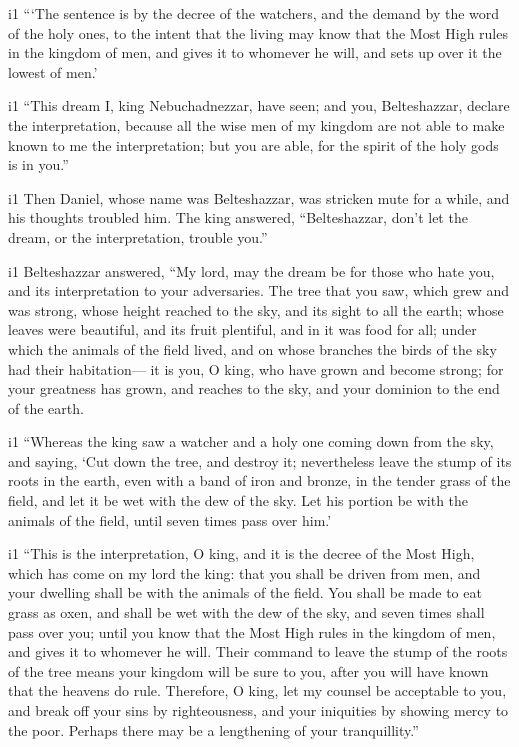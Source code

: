 i1 ```The sentence is by the decree of the watchers, and
the demand by the word of the holy ones, to the intent that the living
may know that the Most High rules in the kingdom of men, and gives it to
whomever he will, and sets up over it the lowest of men.'

i1 ``This dream I, king Nebuchadnezzar, have seen; and you,
Belteshazzar, declare the interpretation, because all the wise men of my
kingdom are not able to make known to me the interpretation; but you are
able, for the spirit of the holy gods is in you.''

i1 Then Daniel, whose name was Belteshazzar, was stricken
mute for a while, and his thoughts troubled him. The king answered,
``Belteshazzar, don't let the dream, or the interpretation, trouble
you.''

i1 Belteshazzar answered, ``My lord, may the dream be for those who hate
you, and its interpretation to your adversaries.  The tree
that you saw, which grew and was strong, whose height reached to the
sky, and its sight to all the earth;  whose leaves were
beautiful, and its fruit plentiful, and in it was food for all; under
which the animals of the field lived, and on whose branches the birds of
the sky had their habitation---  it is you, O king, who
have grown and become strong; for your greatness has grown, and reaches
to the sky, and your dominion to the end of the earth.

i1 ``Whereas the king saw a watcher and a holy one coming
down from the sky, and saying, `Cut down the tree, and destroy it;
nevertheless leave the stump of its roots in the earth, even with a band
of iron and bronze, in the tender grass of the field, and let it be wet
with the dew of the sky. Let his portion be with the animals of the
field, until seven times pass over him.'

i1 ``This is the interpretation, O king, and it is the
decree of the Most High, which has come on my lord the king:
 that you shall be driven from men, and your dwelling shall
be with the animals of the field. You shall be made to eat grass as
oxen, and shall be wet with the dew of the sky, and seven times shall
pass over you; until you know that the Most High rules in the kingdom of
men, and gives it to whomever he will.  Their command to
leave the stump of the roots of the tree means your kingdom will be sure
to you, after you will have known that the heavens do rule.
 Therefore, O king, let my counsel be acceptable to you,
and break off your sins by righteousness, and your iniquities by showing
mercy to the poor. Perhaps there may be a lengthening of your
tranquillity.''

